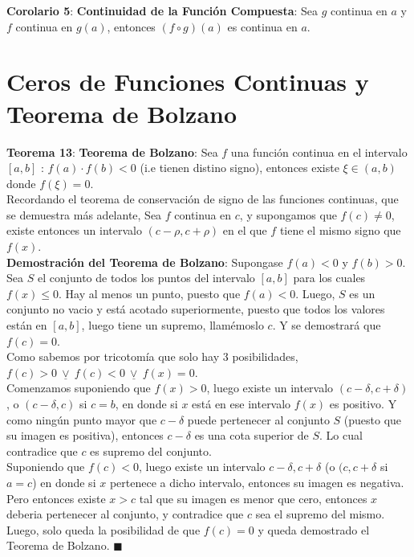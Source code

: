 \documentclass[11pt,a4paper]{article}
\newcommand*{\QEDA}{\null\nobreak\hfill\ensuremath{\blacksquare}}
\begin{document}
\noindent \textbf{Corolario 5}: \textbf{Continuidad de la Funci\'on Compuesta}: Sea $g$ continua en $a$ y $f$ continua en $g(a)$, entonces $(f\circ g)(a)$ es continua en $a$.

\section{Ceros de Funciones Continuas y Teorema de Bolzano}
\noindent \textbf{Teorema 13}: \textbf{Teorema de Bolzano}: Sea $f$ una funci\'on continua en el intervalo $[a,b]$ : $f(a)\cdot f(b) < 0$ (i.e tienen distino signo), entonces existe $\xi \in (a,b)$ donde $f(\xi) = 0$.\\
\indent Recordando el teorema de conservaci\'on de signo de las funciones continuas, que se demuestra m\'as adelante, Sea $f$ continua en $c$, y supongamos que $f(c)\not = 0$, existe entonces un intervalo $(c-\rho, c+\rho)$ en el que $f$ tiene el mismo signo que $f(x)$.\\
\textbf{Demostraci\'on del Teorema de Bolzano}: Supongase $f(a)<0$ y $f(b)>0$. Sea $S$ el conjunto de todos los puntos del intervalo $[a,b]$ para los cuales $f(x)\leq 0$. Hay al menos un punto, puesto que $f(a) < 0$. Luego, $S$ es un conjunto no vacio y est\'a acotado superiormente, puesto que todos los valores est\'an en $[a,b]$, luego tiene un supremo, llam\'emoslo $c$. Y se demostrar\'a que $f(c)=0$.\\
\indent Como sabemos por tricotom\'ia que solo hay 3 posibilidades, $f(c) > 0\ \underline{\lor}\ f(c) < 0\ \underline{\lor}\ f(x) = 0$.\\
\indent Comenzamos suponiendo que $f(x)>0$, luego existe un intervalo $(c-\delta, c+\delta)$, o $(c-\delta, c)$ si $c=b$, en donde si $x$ est\'a en ese intervalo $f(x)$ es positivo. Y como ning\'un punto mayor que $c-\delta$ puede pertenecer al conjunto $S$ (puesto que su imagen es positiva), entonces $c-\delta$ es una cota superior de $S$. Lo cual contradice que $c$ es supremo del conjunto.\\
\indent Suponiendo que $f(c) < 0$, luego existe un intervalo $c-\delta,c+\delta$ (o $(c, c+\delta$ si $a=c$) en donde si $x$ pertenece a dicho intervalo, entonces su imagen es negativa. Pero entonces existe $x > c$ tal que su imagen es menor que cero, entonces $x$ deberia pertenecer al conjunto, y contradice que $c$ sea el supremo del mismo.\\ 
\indent Luego, solo queda la posibilidad de que $f(c)=0$ y queda demostrado el Teorema de Bolzano. \QEDA\\
\end{document}
